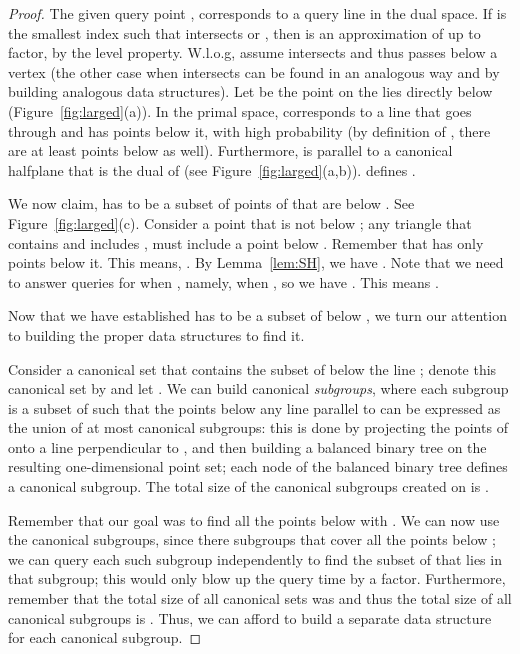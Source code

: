 \begin{proof}
    The given query  point , corresponds to a query line  in the dual space.
    If  is the smallest index such that  intersects  or , then
     is an approximation of  up to  factor, by the level property.
    W.l.o.g, assume  intersects  and thus passes below a vertex 
    (the other case when  intersects  can be found in an analogous way and by
    building analogous data structures).
	Let  be the point on  the lies directly below  (Figure~\ref{fig:larged}(a)).
    In the primal space,  corresponds to a line that goes through  and has 
    points below it, with high probability (by definition of , there are at least
	 points below  as well).
    Furthermore,  is parallel to a canonical halfplane that is the dual of  
    (see Figure~\ref{fig:larged}(a,b)).
     defines .

    We now claim,  has to be a subset of points of  that are below .
    See Figure~\ref{fig:larged}(c).
    Consider a point  that is not below ; any triangle that contains  and includes ,
    must include a point below .
    Remember that  has only  points below it. 
    This means, .
     By Lemma~\ref{lem:SH}, we have .
    Note that we need to answer queries for when ,
	namely, when ,
    so we have .
    This means .

    Now that we have established  has to be a subset of  below , we turn our attention to 
    building the proper data structures to find it.

    Consider a canonical set that contains the subset of  below the line ; denote this
	canonical set by  and let .
    We can build  canonical \emph{subgroups}, where each subgroup is a subset of 
    such that the points below any line  parallel to  can be
    expressed as the union of at most  canonical subgroups:
    this is done by projecting the points of  onto a line perpendicular to ,
    and then building a balanced binary tree on the resulting one-dimensional point set; each
    node of the balanced binary tree defines a canonical subgroup.
    The total size of the canonical subgroups created on  is .

    Remember that our goal was to find all the points  below  with .
    We can now use the canonical subgroups, since there  subgroups that cover all the
	points below ;
    we can query each such subgroup independently to find the subset of  that lies in that subgroup;
    this would only blow up the query time by a  factor.
    Furthermore, remember that the total size of all canonical sets was  and thus the total size
    of all canonical subgroups is .
    Thus, we can afford to build  a separate data structure for each canonical subgroup.


\end{proof}
